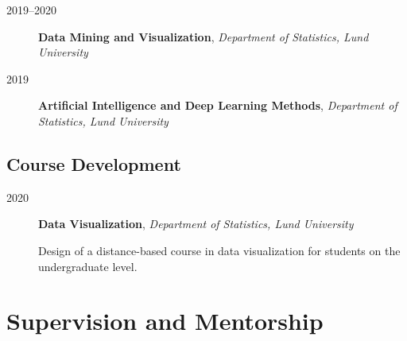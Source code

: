 \documentclass[
  10pt,
  headsepline=true,
  english,
  DIV=12
]{scrartcl}
\renewcommand*{%
  \mkbibnamegiven
}[1]{\ifitemannotation{highlight}{\textbf{#1}}{#1}}
\renewcommand*{%
  \mkbibnamefamily
}[1]{\ifitemannotation{highlight}{\textbf{#1}}{#1}}
\begin{document}
\begin{description}

  \item[2019--2020]{
        \textbf{Data Mining and Visualization}, \emph{Department of Statistics,
          Lund University}

        }

  \item[2019]{
        \textbf{Artificial Intelligence and Deep Learning Methods},
        \emph{Department of Statistics, Lund University}

        }

\end{description}

\subsection{Course Development}

\begin{description}
  \item[2020]{
        \textbf{Data Visualization}, \emph{Department of Statistics, Lund
          University}

        Design of a distance-based course in data visualization for students on
        the undergraduate level.
        }
\end{description}

\hypertarget{supervision}{%
  \section{Supervision and Mentorship}\label{supervision}}
\end{document}
